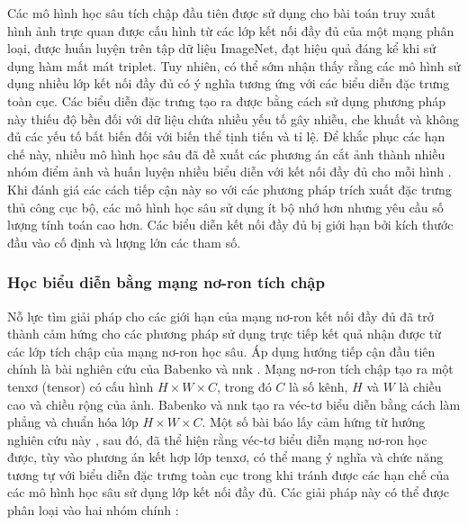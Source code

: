 Các mô hình học sâu tích chập đầu tiên được sử dụng cho bài toán truy xuất hình ảnh trực quan được cấu hình từ các lớp kết nối đầy đủ\cite{razavian2014cnn, gong2014multiscale, babenko2014neural, deepindex, image-classification-retrieval, wang2014deep} của một mạng phân loại, được huấn luyện trên tập dữ liệu ImageNet\cite{russakovsky2015imagenet}, đạt hiệu quả đáng kể khi sử dụng hàm mất mát triplet\cite{wang2014deep, gomezojeda2015training}. Tuy nhiên, có thể sớm nhận thấy rằng các mô hình sử dụng nhiều lớp kết nối đầy đủ có ý nghĩa tương ứng với các biểu diễn đặc trưng toàn cục. Các biểu diễn đặc trưng tạo ra được bằng cách sử dụng phương pháp này thiếu độ bền đối với dữ liệu chứa nhiều yếu tố gây nhiễu, che khuất và không đủ các yếu tố bất biến đối với biến thể tịnh tiến và tỉ lệ. Để khắc phục các hạn chế này, nhiều mô hình học sâu đã đề xuất các phương án cắt ảnh thành nhiều nhóm điểm ảnh và huấn luyện nhiều biểu diễn với kết nối đầy đủ cho mỗi hình \cite{razavian2014cnn, babenko2014neural}. Khi đánh giá các cách tiếp cận này so với các phương pháp trích xuất đặc trưng thủ công cục bộ, các mô hình học sâu sử dụng ít bộ nhớ hơn nhưng yêu cầu số lượng tính toán cao hơn. Các biểu diễn kết nối đầy đủ bị giới hạn bởi kích thước đầu vào cố định và lượng lớn các tham số.

\subsubsection{Học biểu diễn bằng mạng nơ-ron tích chập}

Nỗ lực tìm giải pháp cho các giới hạn của mạng nơ-ron kết nối đầy đủ đã trở thành cảm hứng cho các phương pháp sử dụng trực tiếp kết quả nhận được từ các lớp tích chập của mạng nơ-ron học sâu. Áp dụng hướng tiếp cận đầu tiên chính là bài nghiên cứu của Babenko và nnk \cite{babenko2014neural}. Mạng nơ-ron tích chập tạo ra một tenxơ (tensor) có cấu hình \(H \times W \times C\), trong đó \(C\) là số kênh, \(H\) và \(W\) là chiều cao và chiều rộng của ảnh. Babenko và nnk tạo ra véc-tơ biểu diễn bằng cách làm phẳng và chuẩn hóa lớp \(H \times W \times C\). Một số bài báo lấy cảm hứng từ hướng nghiên cứu này \cite{hou2015convolutional}, sau đó, đã thể hiện rằng véc-tơ biểu diễn mạng nơ-ron học được, tùy vào phương án kết hợp lớp tenxơ, có thể mang ý nghĩa và chức năng tương tự với biểu diễn đặc trưng toàn cục trong khi tránh được các hạn chế của các mô hình học sâu sử dụng lớp kết nối đầy đủ. Các giải pháp này có thể được phân loại vào hai nhóm chính \cite{Masone2021ASO}:

